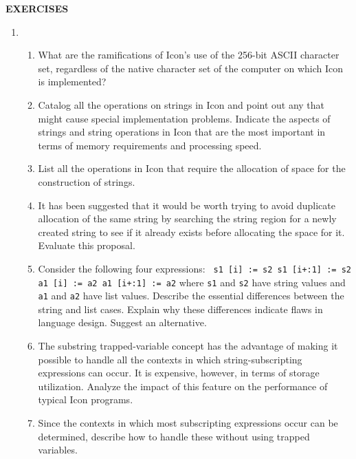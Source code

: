 {\sffamily\bfseries EXERCISES}

\liststyleLv
\begin{enumerate}
\item \begin{enumerate}

\item What are the ramifications of Icon's use of the 256-bit ASCII
character set, regardless of the {\textquotedbl}native{\textquotedbl}
character set of the computer on which Icon is implemented?

\item Catalog all the operations on strings in Icon and point out any
that might cause special implementation problems.  Indicate the
aspects of strings and string operations in Icon that are the most
important in terms of memory requirements and processing speed.

\item List all the operations in Icon that require the allocation of
space for the construction of strings.

\item It has been suggested that it would be worth trying to avoid
duplicate allocation of the same string by searching the string region
for a newly created string to see if it already exists before
allocating the space for it. Evaluate this proposal.

\item 
Consider the following four expressions:\newline
\texttt{ s1 [i] := s2\newline
 s1 [i+:1] := s2\newline
 a1 [i] := a2\newline
 a1 [i+:1] := a2}\newline
where \texttt{s1} and \texttt{s2} have string values and \texttt{a1}
and \texttt{a2} have list values. Describe the essential differences
between the string and list cases. Explain why these differences
indicate flaws in language design. Suggest an alternative.

\item The substring trapped-variable concept has the advantage of
making it possible to handle all the contexts in which
string-subscripting expressions can occur. It is expensive, however,
in terms of storage utilization. Analyze the impact of this feature on
the performance of {\textquotedbl}typical{\textquotedbl} Icon
programs.

\item Since the contexts in which most subscripting expressions occur
can be determined, describe how to handle these without using trapped
variables.


\end{enumerate}
\end{enumerate}
